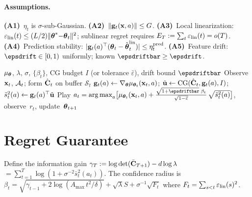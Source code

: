\documentclass[11pt]{article}
\begin{document}
\paragraph{Assumptions.}
\textbf{(A1)}~$\eta_t$ is $\sigma$-sub-Gaussian.
\textbf{(A2)}~$\|\mathbf{g}_t(\mathbf{x},a)\|\le G$.
\textbf{(A3)}~Local linearization:
$\varepsilon_{\mathrm{lin}}(t)\le(L/2)\|\boldsymbol{\theta}^*{-}\boldsymbol{\theta}_t\|^2$;
sublinear regret requires $E_T:=\sum_t\varepsilon_{\mathrm{lin}}(t)=o(T)$.
\textbf{(A4)}~Prediction stability:
$|\mathbf{g}_t(a)^\top(\boldsymbol{\theta}_t-\hat{\boldsymbol{\theta}}_t^{\mathrm{lin}})|\le\eta_t^{\mathrm{pred}}$.
\textbf{(A5)}~Feature drift: $\epsdrift\in[0,1)$ uniformly; known
$\epsdriftbar\ge\epsdrift$.

\begin{algorithm}[h]
\caption{Curvature-Calibrated UCB (CC-UCB)}\label{alg:2p-ccucb}
\begin{algorithmic}[1]
\REQUIRE $\mu_{\boldsymbol{\theta}}$, $\lambda$, $\sigma$, $\{\beta_t\}$,
         CG budget $I$ (or tolerance $\bar\varepsilon$),
         drift bound $\epsdriftbar$
  \STATE Observe $\mathbf{x}_t$, $\mathcal{A}_t$; form $\hat{\mathbf{C}}_t$ on buffer $\mathcal{S}_t$
    \STATE $\mathbf{g}_t(a)\gets\nabla_{\boldsymbol{\theta}}\mu_{\boldsymbol{\theta}_t}(\mathbf{x}_t,a)$;
    $\tilde{\mathbf{u}}\gets\mathrm{CG}(\hat{\mathbf{C}}_t,\mathbf{g}_t(a),I)$;
    $\tilde{s}_t^2(a)\gets\mathbf{g}_t(a)^\top\tilde{\mathbf{u}}$
  \ENDFOR
  \STATE Play $a_t=\argmax_a\bigl[
    \mu_{\btheta_t}(\bx_t,a)+\frac{\sqrt{1{+}\epsdriftbar}\;\beta_t}
    {\sqrt{1{-}\bar\varepsilon}}\,\sqrt{\tilde{s}_t^2(a)}\bigr]$,
    observe~$r_t$, update~$\boldsymbol{\theta}_{t+1}$
\ENDFOR
\end{algorithmic}
\end{algorithm}

\section{Regret Guarantee}

Define the information gain
$\gamma_T:=\log\det(\bar{\mathbf{C}}_{T+1})-d\log\lambda$
$=\sum_{t=1}^T\log(1+\sigma^{-2}\bar s_t^2(a_t))$.
The confidence radius is
$\beta_t = \sqrt{\gamma_{t-1}+2\log(A_{\max}\,t^2/\delta)} + \sqrt{\lambda}S
+ \sigma^{-1}\sqrt{F_t}$
where $F_t=\sum_{s<t}\varepsilon_{\mathrm{lin}}(s)^2$.
\end{document}

